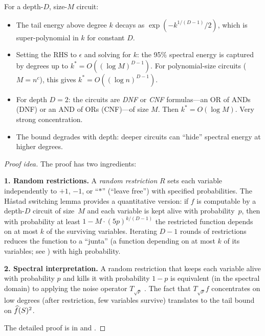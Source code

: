 \begin{remark}\label{rem:lmn-meaning}
For a depth-$D$, size-$M$ circuit:
\begin{itemize}
  \item The tail energy above degree $k$ decays as
    $\exp(-k^{1/(D-1)}/2)$, which is super-polynomial in $k$ for
    constant $D$.
  \item Setting the RHS to $\epsilon$ and solving for $k$: the 95\%
    spectral energy is captured by degrees up to
    $k^* = O((\log M)^{D-1})$. For polynomial-size circuits ($M = n^c$),
    this gives $k^* = O((\log n)^{D-1})$.
  \item For depth $D = 2$: the circuits are \emph{DNF} or \emph{CNF}
    formulas---an OR of ANDs (DNF) or an AND of ORs (CNF)---of size $M$.
    Then $k^* = O(\log M)$. Very strong concentration.
  \item The bound degrades with depth: deeper circuits can ``hide''
    spectral energy at higher degrees.
\end{itemize}
\end{remark}

\begin{proof}[Proof idea]
The proof has two ingredients:

\textbf{1. Random restrictions.}
A \emph{random restriction} $R$ sets each variable independently to
$+1$, $-1$, or ``$\ast$'' (``leave free'') with specified
probabilities. The H\r{a}stad switching lemma
\citep{hastad1987computational} provides a quantitative version: if
$f$ is computable by a depth-$D$ circuit of size~$M$ and each variable
is kept alive with probability~$p$, then with probability at least
$1 - M \cdot (5p)^{k/(D-1)}$ the restricted function depends on at most
$k$ of the surviving variables. Iterating $D-1$ rounds of restrictions
reduces the function to a ``junta'' (a function depending on at most
$k$ of its variables; see \citealp[\S3.1]{odonnell2014analysis})
with high probability.

\textbf{2. Spectral interpretation.}
A random restriction that keeps each variable alive with probability $p$
and kills it with probability $1-p$ is equivalent (in the spectral
domain) to applying the noise operator $T_{\sqrt{p}}$
\citep[\S4.1]{odonnell2014analysis}. The fact that
$T_{\sqrt{p}} f$ concentrates on low degrees (after restriction, few
variables survive) translates to the tail bound on $\widehat{f}(S)^2$.

The detailed proof is in \citet[Chapter~4]{odonnell2014analysis} and
\citet{linial1993constant}.
\end{proof}

